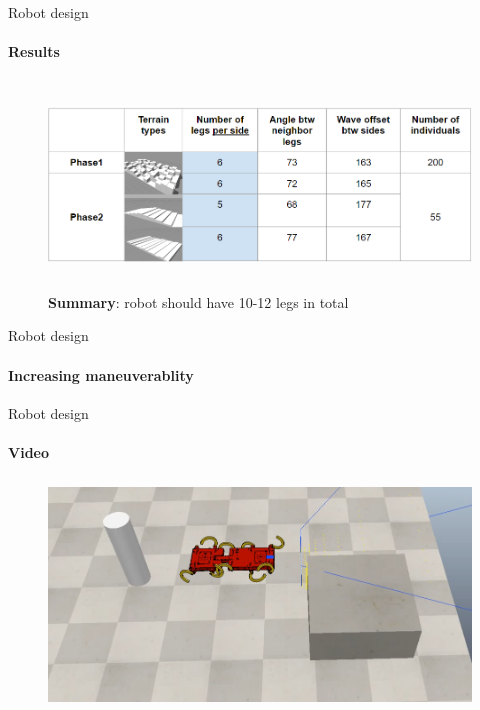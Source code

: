 \documentclass[aspectratio=169]{beamer}
\begin{document}
\begin{frame}[t]{Robot design}
    \framesubtitle{Results}
    \vspace{-0.5cm}
    \begin{figure}[H]
        \centering\includegraphics[height=5.5cm,width=1\textwidth,keepaspectratio]{table_terrain.png}
        \caption*{\LARGE\centering\textbf{Summary}: robot should have 10-12 legs in total}
        \label{fig:table_terrain.png}
    \end{figure}
\end{frame}

\begin{frame}[t]{Robot design}
    \framesubtitle{Increasing maneuverablity}
\end{frame}

\begin{frame}[t]{Robot design}
    \framesubtitle{Video}
    \vspace{-0.6cm}
    \begin{figure}[H]
        \href{run:./videos/sidestep_segments.mp4}{
            \centering\includegraphics[height=6cm,width=1\textwidth,keepaspectratio]{sidestep_segment_video_preview.png}}
    \end{figure}
\end{frame}
\end{document}
